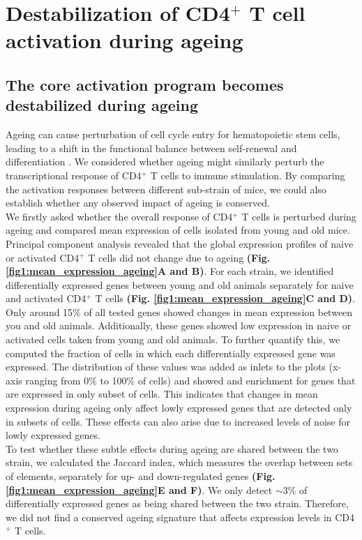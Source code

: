 \newpage

\section{Destabilization of CD4$^+$ T cell activation during ageing}
\subsection*{The core activation program becomes destabilized during ageing}

Ageing can cause perturbation of cell cycle entry for hematopoietic stem cells, leading to a shift in the functional balance between self-renewal and differentiation \citep{Kowalczyk2015}. We considered whether ageing might similarly perturb the transcriptional response of CD4$^+$ T cells to immune stimulation. By comparing the activation responses between different sub-strain of mice, we could also establish whether any observed impact of ageing is conserved.\\

We firstly asked whether the overall response of CD4$^+$ T cells is perturbed during ageing and compared mean expression of cells isolated from young and old mice. Principal component analysis revealed that the global expression profiles of naive or activated CD4$^+$ T cells did not change due to ageing \textbf{(Fig. \ref{fig1:mean_expression_ageing}A and B)}. For each strain, we identified differentially expressed genes between young and old animals separately for naive and activated CD4$^+$ T cells \textbf{(Fig. \ref{fig1:mean_expression_ageing}C and D)}. Only around 15\% of all tested genes showed changes in mean expression between you and old animals. Additionally, these genes showed low expression in naive or activated cells taken from young and old animals. To further quantify this, we computed the fraction of cells in which each differentially expressed gene was expressed. The distribution of these values was added as inlets to the plots (x-axis ranging from 0\% to 100\% of cells) and showed and enrichment for genes that are expressed in only subset of cells. This indicates that changes in mean expression during ageing only affect lowly expressed genes that are detected only in subsets of cells. These effects can also arise due to increased levels of noise for lowly expressed genes. \\

To test whether these subtle effects during ageing are shared between the two strain, we calculated the Jaccard index, which measures the overlap between sets of elements, separately for up- and down-regulated genes \textbf{(Fig. \ref{fig1:mean_expression_ageing}E and F)}. We only detect $\sim$3\% of differentially expressed genes as being shared between the two strain. Therefore, we did not find a conserved ageing signature that affects expression levels in CD4$^+$ T cells.

